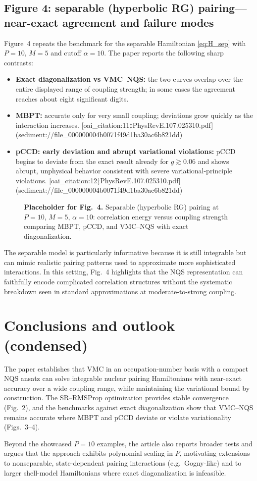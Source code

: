 \subsection{Figure 4: separable (hyperbolic RG) pairing---near-exact agreement and failure modes}
Figure~4 repeats the benchmark for the separable Hamiltonian \eqref{eq:H_sep} with $P=10$, $M=5$ and cutoff $\alpha=10$.
The paper reports the following sharp contrasts:
\begin{itemize}
\item \textbf{Exact diagonalization vs VMC--NQS:} the two curves overlap over the entire displayed range of coupling
strength; in some cases the agreement reaches about eight significant digits. 
\item \textbf{MBPT:} accurate only for very small coupling; deviations grow quickly as the interaction increases.  [oai_citation:11‡PhysRevE.107.025310.pdf](sediment://file_000000004b0071f49d1ba30ac6b821dd)
\item \textbf{pCCD: early deviation and abrupt variational violations:} pCCD begins to deviate from the exact result already
for $g\gtrsim 0.06$ and shows abrupt, unphysical behavior consistent with severe variational-principle violations.  [oai_citation:12‡PhysRevE.107.025310.pdf](sediment://file_000000004b0071f49d1ba30ac6b821dd)
\end{itemize}

\begin{figure}[t]
\centering
\fbox{\rule{0pt}{48mm}\rule{0.92\linewidth}{0pt}}
\caption{\textbf{Placeholder for Fig.\ 4.} Separable (hyperbolic RG) pairing at $P=10$, $M=5$, $\alpha=10$: correlation energy
versus coupling strength comparing MBPT, pCCD, and VMC--NQS with exact diagonalization.}
\label{fig:fig4_placeholder}
\end{figure}

The separable model is particularly informative because it is still integrable but can mimic realistic pairing patterns
used to approximate more sophisticated interactions. In this setting, Fig.~4 highlights that the NQS representation
can faithfully encode complicated correlation structures without the systematic breakdown seen in standard
approximations at moderate-to-strong coupling. 

\section{Conclusions and outlook (condensed)}
The paper establishes that VMC in an occupation-number basis with a compact NQS ansatz can solve integrable nuclear
pairing Hamiltonians with near-exact accuracy over a wide coupling range, while maintaining the variational bound by
construction. The SR--RMSProp optimization provides stable convergence (Fig.~2), and the benchmarks against exact
diagonalization show that VMC--NQS remains accurate where MBPT and pCCD deviate or violate variationality
(Figs.~3--4). 

Beyond the showcased $P=10$ examples, the article also reports broader tests and argues that the approach exhibits
polynomial scaling in $P$, motivating extensions to nonseparable, state-dependent pairing interactions (e.g.\ Gogny-like)
and to larger shell-model Hamiltonians where exact diagonalization is infeasible. 
